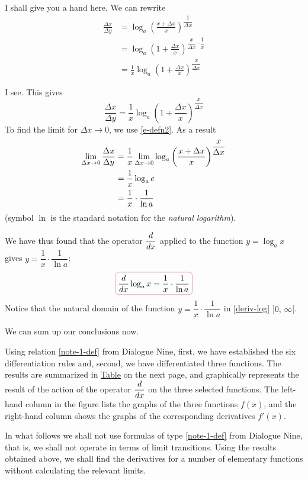 \athr I shall give you a hand here. We can rewrite
\begin{align*}%
\frac{\Delta x}{\Delta y} & = \log_{a} \left( \frac{x + \Delta x}{x} \right)^{\dfrac{1}{\Delta x}} \\
& =  \log_{a} \left( 1 + \frac{\Delta x}{x}  \right)^{\dfrac{x}{\Delta x} \cdot \dfrac{1}{x}} \\
& = \frac{1}{x} \log_{a} \left( 1 + \frac{\Delta x}{x} \right)^{\dfrac{ x}{\Delta x}}
\end{align*}

\rdr I see. This gives
\begin{equation*}%
\frac{\Delta x}{\Delta y}  = \frac{1}{x} \log_{a} \left( 1 + \frac{\Delta x}{x} \right)^{\dfrac{ x}{\Delta x}}
\end{equation*}
To find the limit for $\Delta x \to 0$, we use \eqref{e-defn2}. As a result 
\begin{align*}%
\lmts{\Delta x}{0} \frac{\Delta x}{\Delta y} & = \frac{1}{x} \lmts{\Delta x}{0}  \log_{a} \left( \frac{x + \Delta x}{x} \right)^{\dfrac{x}{\Delta x}} \\
& =  \frac{1}{x}  \log_{a} e \\
& =  \frac{1}{x} \cdot \frac{1}{\ln a}
\end{align*}
(symbol $\ln$ is the standard notation for the \emph{natural logarithm}).
 
\athr We have thus found that the operator $\dfrac{d}{dx}$ applied to the function $y = \log_{a} x$ gives $ y =  \dfrac{1}{x} \cdot \dfrac{1}{\ln a}$:
\begin{equation}%
\boxed{\ddx \log_{a} x  = \frac{1}{x} \cdot \frac{1}{\ln a}}
\label{deriv-log}
\end{equation}
Notice that the natural domain of the function $y =  \dfrac{1}{x} \cdot \dfrac{1}{\ln a}$ in \eqref{deriv-log} $] 0, \, \infty [$.

We can sum up our conclusions now. 
 
Using relation \eqref{note-1-def} from Dialogue Nine, first, we have established the six differentiation rules and, second, we have differentiated three functions. The results are summarized in \hyperref[diff-rules]{Table} on the next page, and  graphically represents the
result of the action of the operator $\dfrac{d}{dx}$ on the three selected
functions. The left-hand column in the figure lists the graphs of the three functions $f (x)$, and the right-hand column shows the graphs of the corresponding derivatives $f' (x)$.	


In what follows we shall not use formulas of type \eqref{note-1-def} from Dialogue Nine, that is, we shall not operate in terms of limit transitions. Using the results obtained above, we shall find the derivatives for a number of elementary functions without calculating the relevant limits.
\newpage 
\vspace*{1cm}

